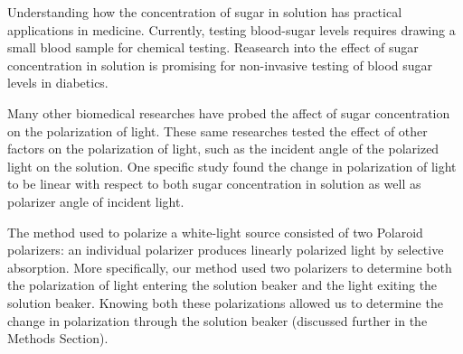 
Understanding how the concentration of sugar in solution has practical applications in medicine. Currently, testing blood-sugar levels requires drawing a small blood sample for chemical testing. Reasearch into the effect of sugar concentration in solution is promising for non-invasive testing of blood sugar levels in diabetics.

Many other biomedical researches have probed the affect of sugar concentration on the polarization of light. These same researches tested the effect of other factors on the polarization of light, such as the incident angle of the polarized light on the solution. One specific study found the change in polarization of light to be linear with respect to both sugar concentration in solution as well as polarizer angle of incident light\cite{Firsdausi2018}.

The method used to polarize a white-light source consisted of two Polaroid polarizers: an individual polarizer produces linearly polarized light by selective absorption. More specifically, our method used two polarizers to determine both the polarization of light entering the solution beaker and the light exiting the solution beaker. Knowing both these polarizations allowed us to determine the change in polarization through the solution beaker (discussed further in the Methods Section).